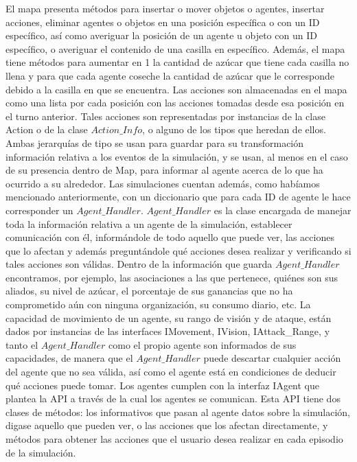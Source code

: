 \documentclass[11pt]{article}
\begin{document}
El mapa presenta métodos para insertar o mover objetos o agentes, insertar acciones, eliminar agentes o objetos en una posición específica o con un ID específico, así como averiguar la posición de un agente u objeto con un ID específico, o averiguar el contenido de una casilla en específico. Además, el mapa tiene métodos para aumentar en 1 la cantidad de azúcar que tiene cada casilla no llena y para que cada agente coseche la cantidad de azúcar que le corresponde debido a la casilla en que se encuentra.
Las acciones son almacenadas en el mapa como una lista por cada posición con las acciones tomadas desde esa posición en el turno anterior. Tales acciones son representadas por instancias de la clase Action o de la clase $Action\_Info$, o alguno de los tipos que heredan de ellos. Ambas jerarquías de tipo se usan para guardar para su transformación información relativa a los eventos de la simulación, y se usan, al menos en el caso de su presencia dentro de Map, para informar al agente acerca de lo que ha ocurrido a su alrededor.
Las simulaciones cuentan además, como habíamos mencionado anteriormente, con un diccionario que para cada ID de agente le hace corresponder un $Agent\_Handler$. $Agent\_Handler$ es la clase encargada de manejar toda la información relativa a un agente de la simulación, establecer comunicación con él, informándole de todo aquello que puede ver, las acciones que lo afectan y además preguntándole qué acciones desea realizar y verificando si tales acciones son válidas. Dentro de la información que guarda $Agent\_Handler$ encontramos, por ejemplo, las asociaciones a las que pertenece, quiénes son sus aliados, su nivel de azúcar, el porcentaje de sus ganancias que no ha comprometido aún con ninguna organización, su consumo diario, etc.
La capacidad de movimiento de un agente, su rango de visión y de ataque, están dados por instancias de las interfaces IMovement, IVision, IAttack\_Range, y tanto el $Agent\_Handler$ como el propio agente son informados de sus capacidades, de manera que el $Agent\_Handler$ puede descartar cualquier acción del agente que no sea válida, así como el agente está en condiciones de deducir qué acciones puede tomar.
Los agentes cumplen con la interfaz IAgent que plantea la API a través de la cual los agentes se comunican. Esta API tiene dos clases de métodos: los informativos que pasan al agente datos sobre la simulación, digase aquello que pueden ver, o las acciones que los afectan directamente, y métodos para obtener las acciones que el usuario desea realizar en cada episodio de la simulación.
\end{document}
